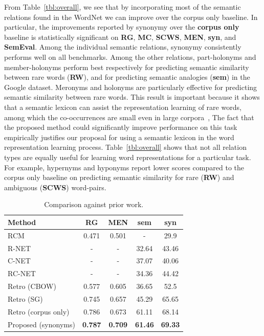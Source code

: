 \documentclass[letterpaper]{article}
\newcommand{\citep}{\cite}
\begin{document}
From Table~\ref{tbl:overall}, we see that by incorporating most of the semantic relations found in the WordNet we can
improve over the corpus only baseline. 
In particular, the improvements reported by synonymy over the \textbf{corpus only} baseline is statistically significant on \textbf{RG},
\textbf{MC}, \textbf{SCWS}, \textbf{MEN}, \textbf{syn}, and \textbf{SemEval}.
Among the individual semantic relations, synonymy consistently performs well on all benchmarks.
Among the other relations, part-holonyms and member-holonyms perform best respectively for predicting semantic similarity
between rare words (\textbf{RW}), and for predicting semantic analogies (\textbf{sem}) in the Google dataset.
Meronyms and holonyms are particularly effective for predicting semantic similarity between rare words.
This result is important because it shows that a semantic lexicon can assist the 
representation learning of rare words, among which the co-occurrences are small even in large corpora~\citep{Luong:CoNLL:2013},
The fact that the proposed method could significantly improve performance on this task 
empirically justifies our proposal for using a semantic lexicon in the word representation learning process.
Table~\ref{tbl:overall} shows that not all relation types are equally useful for learning word representations for a particular task.
For example, hypernyms and hyponyms report lower scores compared to the corpus only baseline on 
predicting semantic similarity for rare (\textbf{RW}) and ambiguous (\textbf{SCWS}) word-pairs.

\begin{table}[t]
\small
\centering
\caption{Comparison against prior work.}
\label{tbl:prior}
\begin{tabular}{|l|c|c|c|c|}\hline 
Method					&	RG		&	MEN	&	sem		&	syn \\ \hline \hline
RCM					&	0.471	&	0.501	&	-		&	29.9 \\
R-NET					&	-		&	-		&	32.64	&	43.46 \\
C-NET					&	-		&	-		&	37.07	&	40.06 \\
RC-NET					&	-		&	-		&	34.36	&	44.42 \\
Retro (CBOW)			&	0.577	&	0.605	&	36.65	&	52.5 \\
Retro (SG)				&	0.745	&	0.657	&	45.29	&	65.65 \\
Retro (corpus only)		&	0.786	&	0.673	&	61.11	&	68.14 \\
Proposed (synonyms)		&	\textbf{0.787}	&	\textbf{0.709}	&	\textbf{61.46}	&	\textbf{69.33} \\ \hline
\end{tabular}
\end{table}
\end{document}
